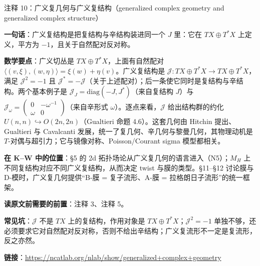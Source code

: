 \begin{kcard}{注释 10：广义复几何与广义复结构（generalized complex geometry and generalized complex structure）}

\textbf{一句话}：广义复结构是把复结构与辛结构装进同一个 $J$ 里：它在 $TX\oplus T^*X$ 上定义，平方为 $-1$，且关于自然配对反对称。

\textbf{数学要点}：广义切丛是 $TX\oplus T^*X$，上面有自然配对 $\langle (v,\xi),(w,\eta)\rangle=\xi(w)+\eta(v)$。广义复结构是 $\mathcal{J}:TX\oplus T^*X\to TX\oplus T^*X$，满足 $\mathcal{J}^2=-1$ 且 $\mathcal{J}^*=-\mathcal{J}$（关于上述配对）；后一条使它同时是复结构与辛结构。两个基本例子是 $\mathcal{J}_J=\mathrm{diag}(-J,J^*)$（来自复结构 $J$）与 $\mathcal{J}_\omega=\begin{pmatrix}0&-\omega^{-1}\\ \omega&0\end{pmatrix}$（来自辛形式 $\omega$）。逐点来看，$\mathcal{J}$ 给出结构群的约化 $U(n,n)\hookrightarrow O(2n,2n)$（Gualtieri 命题 4.6）。这套几何由 Hitchin 提出、Gualtieri 与 Cavalcanti 发展，统一了复几何、辛几何与黎曼几何，其物理动机是 $T$-对偶与超引力；它与镜像对称、Poisson/Courant sigma 模型都相关。

\textbf{在 K--W 中的位置}：§5 的 2d 拓扑场论从广义复几何的语言进入（N5）；$M_H$ 上不同复结构对应不同广义复结构，从而决定 twist 与膜的类型。§11--§12 讨论膜与 D-模时，广义复几何提供“B-膜 = 复子流形、A-膜 = 拉格朗日子流形”的统一框架。

\textbf{读原文前需要的前置}：注释 3、注释 5。

\textbf{常见坑}：$\mathcal{J}$ 不是 $TX$ 上的复结构，作用对象是 $TX\oplus T^*X$；$\mathcal{J}^2=-1$ 单独不够，还必须要求它对自然配对反对称，否则不给出辛结构；广义复流形不一定是复流形，反之亦然。

\noindent\textbf{链接}：\url{https://ncatlab.org/nlab/show/generalized+complex+geometry}
\end{kcard}

